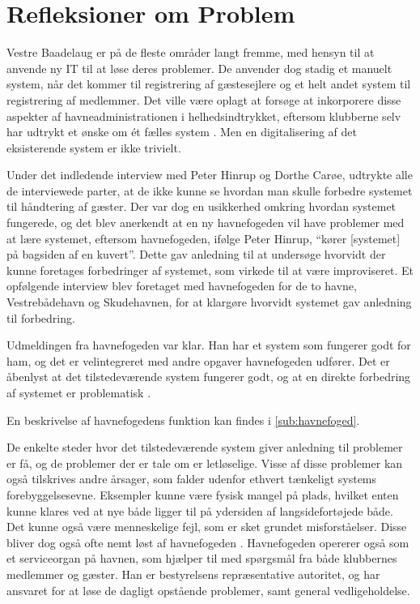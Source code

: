 \section{Refleksioner om Problem}
\label{sec:refleksioner}

Vestre Baadelaug er på de fleste områder langt fremme, med hensyn til at anvende ny IT til at løse deres problemer. De anvender dog stadig et manuelt system, når det kommer til registrering af gæstesejlere og et helt andet system til registrering af medlemmer. Det ville være oplagt at forsøge at inkorporere disse aspekter af havneadministrationen i helhedsindtrykket, eftersom klubberne selv har udtrykt et ønske om ét fælles system \cite{int_vb_sl}. Men en digitalisering af det eksisterende system er ikke trivielt.

Under det indledende interview med Peter Hinrup og Dorthe Carøe, udtrykte alle de interviewede parter, at de ikke kunne se hvordan man skulle forbedre systemet til håndtering af gæster. Der var dog en usikkerhed omkring hvordan systemet fungerede, og det blev anerkendt at en ny havnefogeden vil have problemer med at lære systemet, eftersom havnefogeden, ifølge Peter Hinrup, \enquote{kører [systemet] på bagsiden af en kuvert}. Dette gav anledning til at undersøge hvorvidt der kunne foretages forbedringer af systemet, som virkede til at være improviseret. Et opfølgende interview blev foretaget med havnefogeden for de to havne, Vestrebådehavn og Skudehavnen, for at klargøre hvorvidt systemet gav anledning til forbedring.

Udmeldingen fra havnefogeden var klar. Han har et system som fungerer godt for ham, og det er velintegreret med andre opgaver havnefogeden udfører. Det er åbenlyst at det tilstedeværende system fungerer godt, og at en direkte forbedring af systemet er problematisk \cite{int_hf}. 

En beskrivelse af havnefogedens funktion kan findes i \cref{sub:havnefoged}.

De enkelte steder hvor det tilstedeværende system giver anledning til problemer er få, og de problemer der er tale om er letløselige. Visse af disse problemer kan også tilskrives andre årsager, som falder udenfor ethvert tænkeligt systems forebyggelsesevne. Eksempler kunne være fysisk mangel på plads, hvilket enten kunne klares ved at nye både ligger til på ydersiden af langsidefortøjede både. Det kunne også være menneskelige fejl, som er sket grundet misforståelser. Disse bliver dog også ofte nemt løst af havnefogeden \cite{int_hf}. Havnefogeden opererer også som et serviceorgan på havnen, som hjælper til med spørgsmål fra både klubbernes medlemmer og gæster. Han er bestyrelsens repræsentative autoritet, og har ansvaret for at løse de dagligt opstående problemer, samt general vedligeholdelse. 

